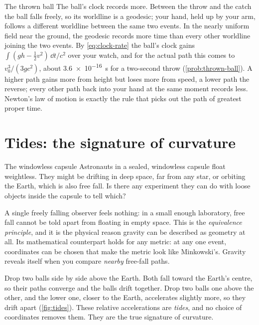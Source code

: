 \begin{revisited}{The thrown ball}
The ball's clock records more. Between the throw and the catch the ball falls
freely, so its worldline is a geodesic; your hand, held up by your arm,
follows a different worldline between the same two events. In the nearly
uniform field near the ground, the geodesic records more time than every other
worldline joining the two events. By
\cref{eq:clock-rate} the ball's clock gains $\int (gh - \tfrac{1}{2}v^{2})\,\dd t/c^{2}$
over your watch, and for the actual path this comes to $v_{0}^{3}/(3gc^{2})$,
about \SI{3.6e-16}{\second} for a two-second throw
(\cref{prob:thrown-ball}). A higher path gains more from height but loses more
from speed, a lower path the reverse; every other path back into your hand at
the same moment records less. Newton's law of motion is exactly the rule that
picks out the path of greatest proper time.
\end{revisited}

\section{Tides: the signature of curvature}\label{sec:tides}

\begin{thought}{The windowless capsule}
Astronauts in a sealed, windowless capsule float weightless. They might be
drifting in deep space, far from any star, or orbiting the Earth, which is
also free fall. Is there any experiment they can do with loose objects inside
the capsule to tell which?
\end{thought}

A single freely falling observer feels nothing: in a small enough laboratory,
free fall cannot be told apart from floating in empty space. This is the
\emph{equivalence principle}, and it is the physical reason gravity can be
described as geometry at all. Its mathematical counterpart holds for any
metric: at any one event, coordinates can be chosen that make the metric look
like Minkowski's. Gravity reveals itself when you compare \emph{nearby}
free-fall paths.

Drop two balls side by side above the Earth. Both fall toward the Earth's
centre, so their paths converge and the balls drift together. Drop two balls
one above the other, and the lower one, closer to the Earth, accelerates
slightly more, so they drift apart (\cref{fig:tides}). These relative
accelerations are \emph{tides}, and no choice of coordinates removes them.
They are the true signature of curvature.

